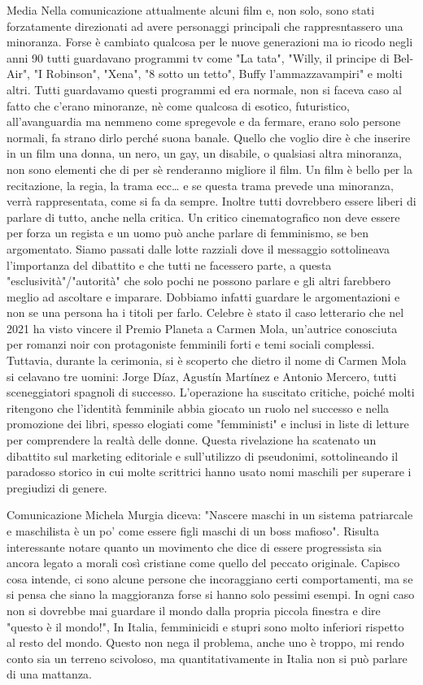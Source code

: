 \documentclass[12pt]{book} %
\begin{document}
Media
Nella comunicazione attualmente alcuni film e, non solo, sono stati forzatamente direzionati ad avere personaggi principali che rappresntassero una minoranza. Forse è cambiato qualcosa per le nuove generazioni ma io ricodo negli anni 90 tutti guardavano programmi tv come "La tata", "Willy, il principe di Bel-Air", "I Robinson", "Xena", "8 sotto un tetto", Buffy l'ammazzavampiri" e molti altri. 
Tutti guardavamo questi programmi ed era normale, non si faceva caso al fatto che c'erano minoranze, nè come qualcosa di esotico, futuristico, all'avanguardia ma nemmeno come spregevole e da fermare, erano solo persone normali, fa strano dirlo perché suona banale. Quello che voglio dire è che inserire in un film una donna, un nero, un gay, un disabile, o qualsiasi altra minoranza, non sono elementi che di per sè renderanno migliore il film. Un film è bello per la recitazione, la regia, la trama ecc… e se questa trama prevede una minoranza, verrà rappresentata, come si fa da sempre. Inoltre tutti dovrebbero essere liberi di parlare di tutto, anche nella critica. Un critico cinematografico non deve essere per forza un regista e un uomo può anche parlare di femminismo, se ben argomentato. Siamo passati dalle lotte razziali dove il messaggio sottolineava l'importanza del dibattito e che tutti ne facessero parte, a questa "esclusività"/"autorità" che solo pochi ne possono parlare e gli altri farebbero meglio ad ascoltare e imparare. Dobbiamo infatti guardare le argomentazioni e non se una persona ha i titoli per farlo. Celebre è stato il caso letterario che nel 2021 ha visto vincere il Premio Planeta a Carmen Mola, un'autrice conosciuta per romanzi noir con protagoniste femminili forti e temi sociali complessi. Tuttavia, durante la cerimonia, si è scoperto che dietro il nome di Carmen Mola si celavano tre uomini: Jorge Díaz, Agustín Martínez e Antonio Mercero, tutti sceneggiatori spagnoli di successo. L'operazione ha suscitato critiche, poiché molti ritengono che l'identità femminile abbia giocato un ruolo nel successo e nella promozione dei libri, spesso elogiati come "femministi" e inclusi in liste di letture per comprendere la realtà delle donne. Questa rivelazione ha scatenato un dibattito sul marketing editoriale e sull'utilizzo di pseudonimi, sottolineando il paradosso storico in cui molte scrittrici hanno usato nomi maschili per superare i pregiudizi di genere.

Comunicazione
Michela Murgia diceva: "Nascere maschi in un sistema patriarcale e maschilista è un po' come essere figli maschi di un boss mafioso". Risulta interessante notare quanto un movimento che dice di essere progressista sia ancora legato a morali così cristiane come quello del peccato originale. Capisco cosa intende, ci sono alcune persone che incoraggiano certi comportamenti, ma se si pensa che siano la maggioranza forse si hanno solo pessimi esempi. In ogni caso non si dovrebbe mai guardare il mondo dalla propria piccola finestra e dire "questo è il mondo!", In Italia, femminicidi e stupri sono molto inferiori rispetto al resto del mondo. Questo non nega il problema, anche uno è troppo, mi rendo conto sia un terreno scivoloso, ma quantitativamente in Italia non si può parlare di una mattanza. 
\end{document}
